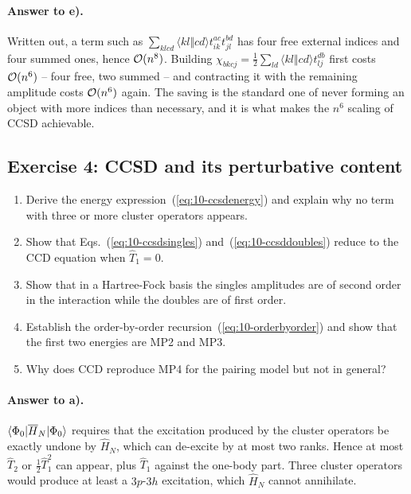 \paragraph{Answer to e).}
Written out, a term such as
$\sum_{klcd}\langle kl\Vert cd\rangle t_{ik}^{ac}t_{jl}^{bd}$ has four free
external indices and four summed ones, hence $\mathcal{O}(n^8)$.  Building
$\chi_{bkcj}=\tfrac12\sum_{ld}\langle kl\Vert cd\rangle t_{lj}^{db}$ first
costs $\mathcal{O}(n^6)$ -- four free, two summed -- and contracting it with the
remaining amplitude costs $\mathcal{O}(n^6)$ again.  The saving is the standard one
of never forming an object with more indices than necessary, and it is what
makes the $n^6$ scaling of CCSD achievable.

\subsection*{Exercise 4: CCSD and its perturbative content}
\label{ex:10-ccsd}

\begin{enumerate}
  \item[a)] Derive the energy expression~(\ref{eq:10-ccsdenergy}) and explain
  why no term with three or more cluster operators appears.
  \item[b)] Show that Eqs.~(\ref{eq:10-ccsdsingles})
  and~(\ref{eq:10-ccsddoubles}) reduce to the CCD equation when
  $\hat{T}_1=0$.
  \item[c)] Show that in a Hartree-Fock basis the singles amplitudes are of
  second order in the interaction while the doubles are of first order.
  \item[d)] Establish the order-by-order recursion~(\ref{eq:10-orderbyorder})
  and show that the first two energies are MP2 and MP3.
  \item[e)] Why does CCD reproduce MP4 for the pairing model but not in
  general?
\end{enumerate}

\paragraph{Answer to a).}
$\langle \Phi_0 | \overline{H}_N | \Phi_0 \rangle$ requires that the excitation
produced by the cluster operators be exactly undone by $\hat{H}_N$, which can
de-excite by at most two ranks.  Hence at most $\hat{T}_2$ or
$\tfrac12\hat{T}_1^2$ can appear, plus $\hat{T}_1$ against the one-body part.
Three cluster operators would produce at least a $3p$-$3h$ excitation, which
$\hat{H}_N$ cannot annihilate.

